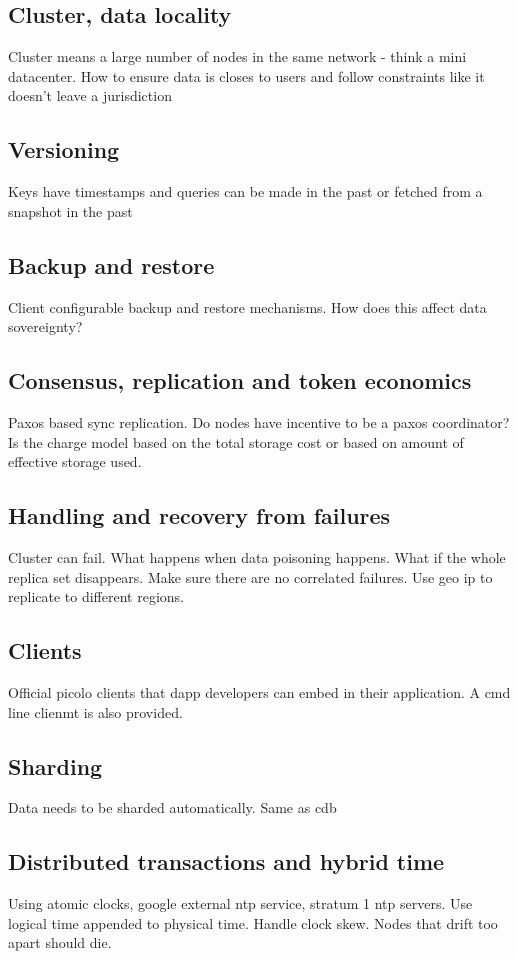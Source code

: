 \subsection{Cluster, data locality}
Cluster means a large number of nodes in the same network - think a mini datacenter. How to ensure data is closes to users and follow constraints like it doesn't leave a jurisdiction
\subsection{Versioning}
Keys have timestamps and queries can be made in the past or fetched from a snapshot in the past
\subsection{Backup  and restore}
Client configurable backup and restore mechanisms. How does this affect data sovereignty?
\subsection{Consensus, replication and token economics}
Paxos based sync replication. Do nodes have incentive to be a paxos coordinator? Is the charge model based on the total storage cost or based on amount of effective storage used.
\subsection{Handling and recovery from  failures}
Cluster can fail. What happens when data poisoning happens. What if the whole replica set disappears. Make sure there are no correlated failures. Use geo ip to replicate to different regions.
\subsection{Clients}
Official picolo clients that dapp developers can embed in their application. A cmd line clienmt is also provided.
\subsection{Sharding}
Data needs to be sharded automatically. Same as cdb
\subsection{Distributed transactions and hybrid time}
Using atomic clocks, google external ntp service, stratum 1 ntp servers. Use logical time appended to physical time. Handle clock skew. Nodes that drift too apart should die. 

